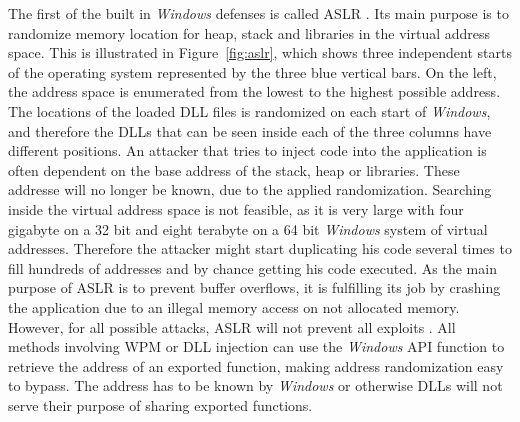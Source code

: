 The first of the built in \emph{Windows} defenses is called \gls{ASLR} \cite{miller2009method}. Its main purpose is to randomize memory location for heap, stack and libraries in the virtual address space. This is illustrated in Figure~\ref{fig:aslr}, which shows three independent starts of the operating system represented by the three blue vertical bars. On the left, the address space is enumerated from the lowest to the highest possible address. The locations of the loaded \gls{DLL} files is randomized on each start of \emph{Windows}, and therefore the \glspl{DLL} that can be seen inside each of the three columns have different positions. An attacker that tries to inject code into the application is often dependent on the base address of the stack, heap or libraries. These addresse will no longer be known, due to the applied randomization. Searching inside the virtual address space is not feasible, as it is very large with four gigabyte on a 32 bit and eight terabyte on a 64 bit \emph{Windows} system of virtual addresses. Therefore the attacker might start duplicating his code several times to fill hundreds of addresses and by chance getting his code executed. As the main purpose of \gls{ASLR} is to prevent buffer overflows, it is fulfilling its job by crashing the application due to an illegal memory access on not allocated memory. However, for all possible attacks, \gls{ASLR} will not prevent all exploits \cite{shacham}. All methods involving \gls{WPM} or \gls{DLL} injection can use the \emph{Windows} \gls{API} function  to retrieve the address of an exported function, making address randomization easy to bypass. The address has to be known by \emph{Windows} or otherwise \glspl{DLL} will not serve their purpose of sharing exported functions.